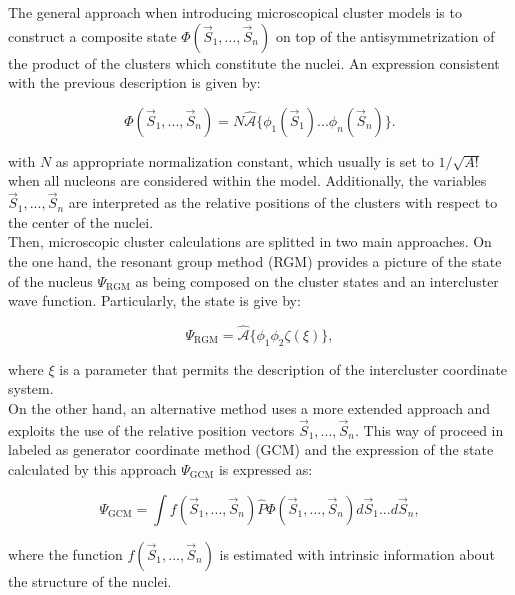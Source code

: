 \documentclass[openany]{book}
\begin{document}
The general approach when introducing microscopical cluster models is to construct a composite state $\Phi(\vec S_1, ..., \vec S_n)$ on top of the antisymmetrization of the product of the clusters which constitute the nuclei. An expression consistent with the previous description is given by:

\begin{equation}\label{eq:micro_cluster_generalizedWaveFunction}
\Phi(\vec S_1, ..., \vec S_n)  = N \hat {\mathcal {A}} \{ \phi_1 (\vec S_1) ...  \phi_n (\vec S_n)\}.
\end{equation}

with $N$ as appropriate normalization constant, which usually is set to $1/\sqrt{A!}$ when all nucleons are considered within the model. Additionally, the variables $\vec S_1, ..., \vec S_n$ are interpreted as the relative positions of the clusters with respect to the center of the nuclei.  \\

Then, microscopic cluster calculations are splitted in two main approaches. On the one hand,  the resonant group method (RGM) provides a picture of the state of the nucleus $	\Psi_{\mathrm{RGM}}$ as being composed on the cluster states and an intercluster wave function. Particularly, the state is give by:

\begin{equation}\label{eq:micro_cluster_RGM_waveFunction}
	\Psi_{\mathrm{RGM}} =  \hat {\mathcal{A}} \{\phi_1 \phi_2 \zeta (\xi) \},
\end{equation}

where $\xi$ is a parameter that permits the description of the intercluster coordinate system. \\

On the other hand, an alternative method uses a more extended approach and exploits the use of the relative position vectors $\vec S_1, ..., \vec S_n$. This way of proceed in labeled as generator coordinate method  (GCM) and the expression of the state calculated by this approach $	\Psi_{\mathrm{GCM}}$ is expressed as: 

\begin{equation}\label{eq:micro_cluster_GCM_waveFunction}
	\Psi_{\mathrm{GCM}} = \int f(\vec S_1, ..., \vec S_n) \hat P \Phi(\vec S_1, ..., \vec S_n) d\vec S_1 ... d\vec S_n,
\end{equation}

where the function $ f(\vec S_1, ..., \vec S_n) $ is estimated with intrinsic information about the structure of the nuclei. \\
\end{document}
